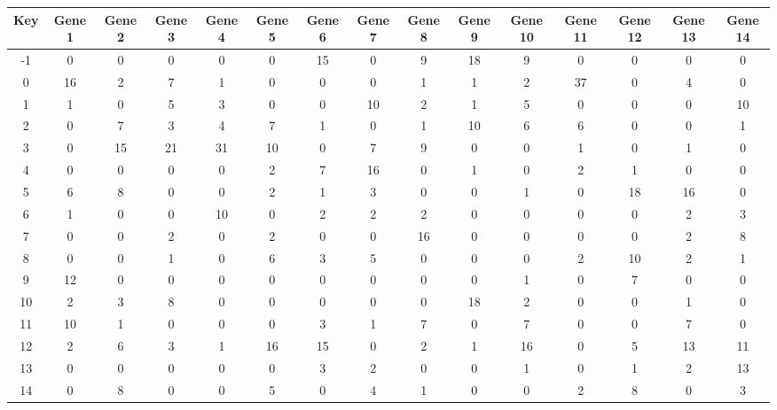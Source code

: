 \begin{tabular}{|c|c|c|c|c|c|c|c|c|c|c|c|c|c|c|}
\hline
Key & Gene 1 & Gene 2 & Gene 3 & Gene 4 & Gene 5 & Gene 6 & Gene 7 & Gene 8 & Gene 9 & Gene 10 & Gene 11 & Gene 12 & Gene 13 & Gene 14 \\
\hline
-1 & 0 & 0 & 0 & 0 & 0 & 15 & 0 & 9 & 18 & 9 & 0 & 0 & 0 & 0 \\
0 & 16 & 2 & 7 & 1 & 0 & 0 & 0 & 1 & 1 & 2 & 37 & 0 & 4 & 0 \\
1 & 1 & 0 & 5 & 3 & 0 & 0 & 10 & 2 & 1 & 5 & 0 & 0 & 0 & 10 \\
2 & 0 & 7 & 3 & 4 & 7 & 1 & 0 & 1 & 10 & 6 & 6 & 0 & 0 & 1 \\
3 & 0 & 15 & 21 & 31 & 10 & 0 & 7 & 9 & 0 & 0 & 1 & 0 & 1 & 0 \\
4 & 0 & 0 & 0 & 0 & 2 & 7 & 16 & 0 & 1 & 0 & 2 & 1 & 0 & 0 \\
5 & 6 & 8 & 0 & 0 & 2 & 1 & 3 & 0 & 0 & 1 & 0 & 18 & 16 & 0 \\
6 & 1 & 0 & 0 & 10 & 0 & 2 & 2 & 2 & 0 & 0 & 0 & 0 & 2 & 3 \\
7 & 0 & 0 & 2 & 0 & 2 & 0 & 0 & 16 & 0 & 0 & 0 & 0 & 2 & 8 \\
8 & 0 & 0 & 1 & 0 & 6 & 3 & 5 & 0 & 0 & 0 & 2 & 10 & 2 & 1 \\
9 & 12 & 0 & 0 & 0 & 0 & 0 & 0 & 0 & 0 & 1 & 0 & 7 & 0 & 0 \\
10 & 2 & 3 & 8 & 0 & 0 & 0 & 0 & 0 & 18 & 2 & 0 & 0 & 1 & 0 \\
11 & 10 & 1 & 0 & 0 & 0 & 3 & 1 & 7 & 0 & 7 & 0 & 0 & 7 & 0 \\
12 & 2 & 6 & 3 & 1 & 16 & 15 & 0 & 2 & 1 & 16 & 0 & 5 & 13 & 11 \\
13 & 0 & 0 & 0 & 0 & 0 & 3 & 2 & 0 & 0 & 1 & 0 & 1 & 2 & 13 \\
14 & 0 & 8 & 0 & 0 & 5 & 0 & 4 & 1 & 0 & 0 & 2 & 8 & 0 & 3 \\
\hline
\end{tabular}